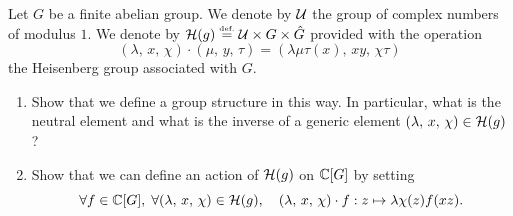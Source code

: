 \begin{exo}
\label{exo-groupe-heisenberg}

 Let $G$ be a finite abelian group. We denote by $\mathcal{U} $ the group of complex numbers of modulus $ 1$. We denote by $\mathcal{H}(g) \stackrel{\mbox{\upshape\tiny def.}}{=} \mathcal{U} \times G \times \hat{G}$ provided with the operation
\begin{equation*}
(\lambda, \, x, \, \chi) \cdot(\mu, \, y, \, \tau) =(\lambda \mu \tau (x), \, xy, \, \chi \tau )
\end{equation*}
the Heisenberg group associated with $G$. \begin{enumerate}
\item Show that we define a group structure in this way. In particular, what is the neutral element and what is the inverse of a generic element $(\lambda, \, x, \, \chi) \in \mathcal{H}(g)$?
\item Show that we can define an action of $\mathcal{H}(g)$ on $\mathbb{C}[G]$ by setting
\begin{equation*}
\forall f \in \mathbb{C}[G], \; \forall(\lambda, \, x, \, \chi) \in \mathcal{H}(g), \quad(\lambda, \, x, \, \chi) \cdot f: z \mapsto \lambda \chi( z) f (xz).
\end{equation*}


\end{enumerate}
\end{exo}
